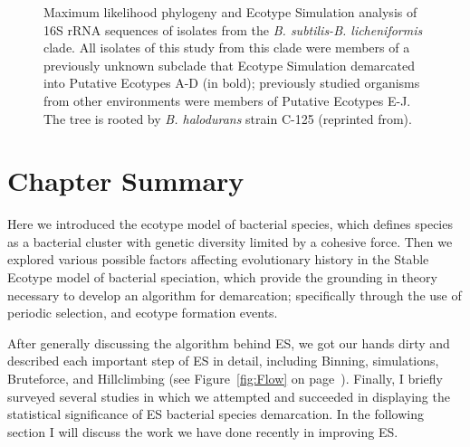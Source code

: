 \begin{figure}[h!]
\caption[Example ES analysis of 16s rRNA sequences of isolates from the \emph{B. subtilis-B.licheniformis} clade.]{Maximum likelihood phylogeny and Ecotype Simulation analysis of 16S rRNA sequences of isolates from the \emph{B. subtilis-B. licheniformis} clade. All isolates of this study from this clade were members of a previously unknown subclade that Ecotype Simulation demarcated into Putative Ecotypes A-D (in bold); previously studied organisms from other environments were members of Putative Ecotypes E-J. The tree is rooted by \emph{B. halodurans} strain C-125 (reprinted from\protect\cite{kim2012diversity}).}
\label{fig:DeathES}
\end{figure}

\section{Chapter Summary}
Here we introduced the ecotype model of bacterial species, which defines species as a bacterial cluster with genetic diversity limited by a cohesive force.
Then we explored various possible factors affecting evolutionary history in the Stable Ecotype model of bacterial speciation, which provide the grounding in theory necessary to develop an algorithm for demarcation; specifically through the use of periodic selection, and ecotype formation events.

After generally discussing the algorithm behind ES, we got our hands dirty and described each important step of ES in detail, including Binning, simulations, Bruteforce, and Hillclimbing (see Figure~\ref{fig:Flow} on page~\pageref{fig:Flow}).
Finally, I briefly surveyed several studies in which we attempted and succeeded in displaying the statistical significance of ES bacterial species demarcation.
In the following section I will discuss the work we have done recently in improving ES.




